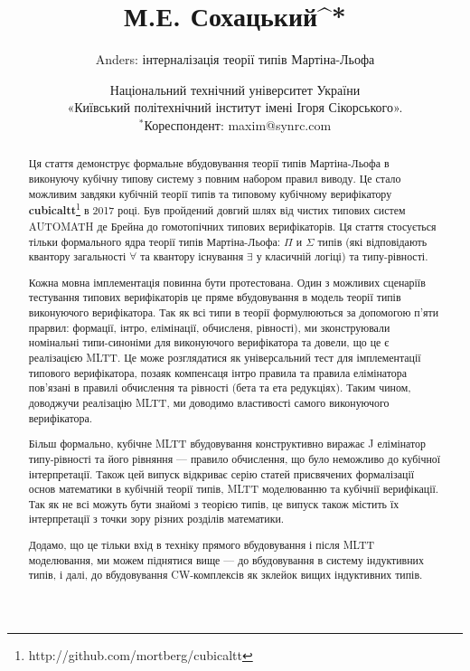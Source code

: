 \documentclass{article}
\theoremstyle{definition}
\begin{document}
\renewcommand{\abstractname}{Анотація}

\title{\small М.Е. Сохацький^{*}}
\author{Anders: інтерналізація теорії типів Мартіна-Льофа}
\date{ \small Національний технічний університет України \\
      «Київський політехнічний інститут імені Ігоря Сікорського».\\
       \small $^*$Кореспондент: maxim@synrc.com}

\maketitle

\begin{abstract}

Ця стаття демонструє формальне вбудовування теорії типів Мартіна-Льофа
в виконуючу кубічну типову систему з повним набором правил виводу.
Це стало можливим завдяки кубічній теорії типів та типовому кубічному верифікатору
{\bf cubicaltt}\footnote{http://github.com/mortberg/cubicaltt} в 2017 році.
Був пройдений довгий шлях від чистих типових систем AUTOMATH де Брейна до
гомотопічних типових верифікаторів. Ця стаття стосується тільки формального ядра
теорії типів Мартіна-Льофа: $\Pi$ и $\Sigma$ типів (які відповідають
квантору загальності $\forall$ та квантору існування $\exists$ у класичній логіці)
та типу-рівності.

Кожна мовна імплементація повинна бути протестована. Один з можливих сценаріїв
тестування типових верифікаторів це пряме вбудовування в модель теорії типів
виконуючого верифікатора. Так як всі типи в теорії формулюються за допомогою п'яти
прарвил: формації, інтро, елімінації, обчисленя, рівності), ми зконструювали
номінальні типи-синоніми для виконуючого верифікатора та довели, що це є реалізацією MLTT.
Це може розглядатися як універсальний тест для імплементації типового верифікатора,
позаяк компенсаця інтро правила та правила елімінатора пов'язані в правилі
обчислення та рівності (бета та ета редукціях). Таким чином, доводжучи реалізацію MLTT,
ми доводимо властивості самого виконуючого верифікатора.

Більш формально, кубічне MLTT вбудовування конструктивно виражає
J елімінатор типу-рівності та його рівняння — правило обчислення,
що було неможливо до кубічної інтерпретації. Також цей випуск
відкриває серію статей присвячених формалізації основ математики в кубічній теорії типів,
MLTT моделюванню та кубічнії верифікації. Так як не всі можуть бути знайомі з теорією типів,
це випуск також містить їх інтерпретації з точки зору різних розділів математики.

Додамо, що це тільки вхід в техніку прямого вбудовування і після MLTT моделювання,
ми можем піднятися вище — до вбудовування в систему індуктивних типів, і далі,
до вбудовування CW-комплексів як зклейок вищих індуктивних типів.

\end{abstract}
\end{document}
